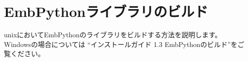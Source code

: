 \newpage
\section{EmbPythonライブラリのビルド}
\label{sec:EmbPythonBuild}
\parindent=0pt

unixにおいてEmbPythonのライブラリをビルドする方法を説明します。
Windowsの場合については
``インストールガイド 1.3 EmbPythonのビルド''をご覧ください。

\bigskip
